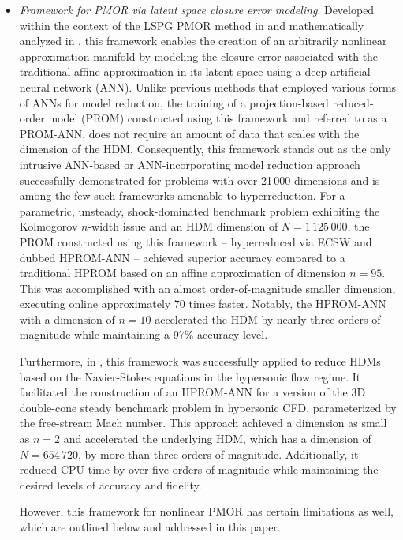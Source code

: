 \documentclass[preprint,10pt]{elsarticle}
\begin{document}
\begin{itemize}
		In \cite{chmiel2025unified}, this combined approach also demonstrated superiority over the integration of the traditional affine approximation with LSPG and ECSW for a 3D 
		benchmark steady hypersonic flow problem parameterized by the free-stream Mach number. It accelerated the underlying HDM, which had a dimension of $N = 654\,720$, by a factor of 291 and 
		reduced its CPU time by a factor of 41\,920 while maintaining the desired levels of accuracy and fidelity -- factors that, for this relatively small scale problem, are higher 
		than those associated with the traditional affine approximation.
	\item {\it Framework for PMOR via latent space closure error modeling}. Developed within the context of the LSPG PMOR method in \cite{barnett2023neural} and mathematically 
		analyzed in \cite{cohen2023nonlinear}, this framework enables the creation of an arbitrarily nonlinear approximation manifold by modeling the closure error associated 
		with the traditional affine approximation in its latent space using a deep artificial neural network (ANN). Unlike previous methods that employed various forms of ANNs 
		for model reduction, the training of a projection-based reduced-order model (PROM) constructed using this framework and referred to as a PROM-ANN, does not require 
		an amount of data that scales with the dimension of the HDM. 
		Consequently, this framework stands out as the only intrusive ANN-based or ANN-incorporating model reduction 
		approach successfully demonstrated for problems with over 21\,000 dimensions and is among the few such frameworks amenable to hyperreduction. For a parametric, unsteady, shock-dominated 
		benchmark problem exhibiting the Kolmogorov $n$-width issue and an HDM dimension of $N = 1\,125\,000$, the PROM constructed using this framework -- hyperreduced via 
		ECSW and dubbed HPROM-ANN -- achieved superior accuracy compared to a traditional HPROM based on an affine approximation of dimension $n = 95$. This was accomplished 
		with an almost order-of-magnitude smaller dimension, executing online approximately 70 times faster. Notably, the HPROM-ANN with a dimension of $n=10$ accelerated the 
		HDM by nearly three orders of magnitude while maintaining a 97\% accuracy level. 

		Furthermore, in \cite{chmiel2025unified}, this framework was successfully applied to reduce HDMs based on the Navier-Stokes equations in the hypersonic flow regime. 
		It facilitated the construction of an HPROM-ANN for a version of the 3D double-cone steady benchmark problem in hypersonic CFD, parameterized by 
		the free-stream Mach number. This approach achieved a dimension as small as $n = 2$ and accelerated the underlying HDM, which has a dimension of $N = 654\,720$, by 
		more than three orders of magnitude. Additionally, it reduced CPU time by over five orders of magnitude while maintaining the desired levels of accuracy and fidelity. 

		However, this framework for nonlinear PMOR has certain limitations as well, which are outlined below and addressed in 
		this paper.
\end{itemize}
\end{document}
